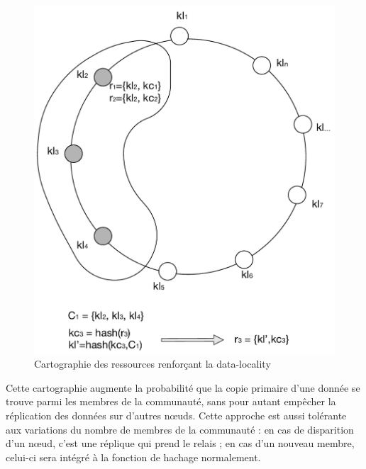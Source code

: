 \begin{figure}[!ht]
	\centering
	\includegraphics[width=1\linewidth]{img/hashing.pdf}
	\caption{Cartographie des ressources renforçant la data-locality}
	\label{fig:Hadoop}
\end{figure}

Cette cartographie augmente la probabilité que la copie primaire d'une donnée se trouve parmi les membres de la communauté, sans pour autant empêcher la réplication des données sur d'autres n\oe{}uds. Cette approche est aussi tolérante aux variations du nombre de membres de la communauté : en cas de disparition d'un n\oe{}ud, c'est une réplique qui prend le relais ; en cas d'un nouveau membre, celui-ci sera intégré à la fonction de hachage normalement.   
